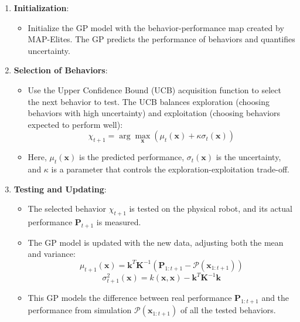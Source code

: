 \documentclass[12pt]{article}
\begin{document}
\begin{enumerate}
    \item \textbf{Initialization}:
        \begin{itemize}
            \item Initialize the GP model with the behavior-performance map created by MAP-Elites. The GP predicts the performance of behaviors and quantifies uncertainty.
        \end{itemize}
    
    \item \textbf{Selection of Behaviors}:
        \begin{itemize}
            \item Use the Upper Confidence Bound (UCB) acquisition function to select the next behavior to test. The UCB balances exploration (choosing behaviors with high uncertainty) and exploitation (choosing behaviors expected to perform well):
            \begin{equation}
            \label{eq:ucb}
            \chi_{t+1} = \arg \max_\mathbf{x} (\mu_t(\mathbf{x}) + \kappa \sigma_t(\mathbf{x}))
            \end{equation}
            \item Here, \(\mu_t(\mathbf{x})\) is the predicted performance, \(\sigma_t(\mathbf{x})\) is the uncertainty, and \(\kappa\) is a parameter that controls the exploration-exploitation trade-off.
        \end{itemize}
    
    \item \textbf{Testing and Updating}:
        \begin{itemize}
            \item The selected behavior $\chi_{t+1} $ is tested on the physical robot, and its actual performance $\mathbf{P}_{t+1}$ is measured.
            \item The GP model is updated with the new data, adjusting both the mean and variance:
            \begin{equation}
            \label{eq:mean_update}
            \mu_{t+1}(\mathbf{x}) = \mathbf{k}^T \mathbf{K}^{-1} (\mathbf{P}_{1:t+1} - \mathcal{P}(\mathbf{x}_{1:t+1}))
            \end{equation}
            \begin{equation}
            \label{eq:variance_update}
           \sigma_{t+1}^2(\mathbf{x}) = k(\mathbf{x}, \mathbf{x}) - \mathbf{k}^T \mathbf{K}^{-1} \mathbf{k}
            \end{equation}
            \item This GP models the difference between real performance $\mathbf{P}_{1:t+1}$ and the performance from simulation $\mathcal{P}(\mathbf{x}_{1:t+1})$ of all the tested behaviors.
        \end{itemize}
    

\end{enumerate}
\end{document}
